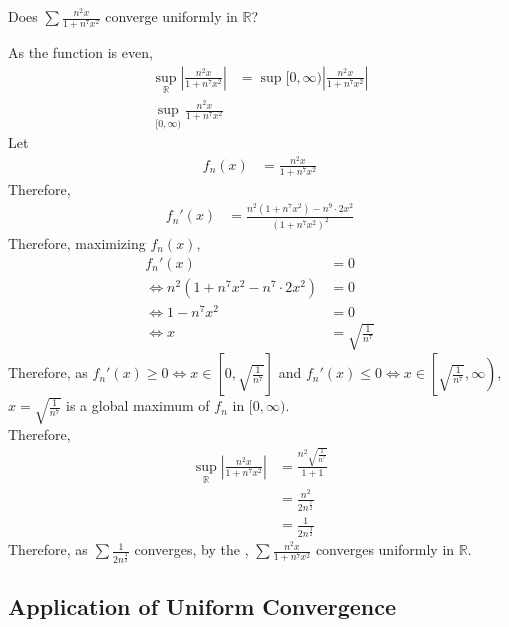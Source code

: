 \documentclass[fleqn, a4paper, 12pt, twoside]{article}
\theoremstyle{definition}
\theoremstyle{theorem}
\begin{document}
\begin{question}
	Does $\sum \frac{n^2 x}{1 + n^7 x^2}$ converge uniformly in $\mathbb{R}$?
\end{question}

\begin{solution}
	As the function is even,
	\begin{align*}
		\sup\limits_{\mathbb{R}} \left| \frac{n^2 x}{1 + n^7 x^2} \right| & = \sup\limits{[0,\infty)} \left| \frac{n^2 x}{1 + n^7 x^2} \right| \\
		\sup\limits_{[0,\infty)} \frac{n^2 x}{1 + n^7 x^2}
	\end{align*}
	Let
	\begin{align*}
		f_n(x) & = \frac{n^2 x}{1 + n^7 x^2}
	\end{align*}
	Therefore,
	\begin{align*}
		{f_n}'(x) & =\frac{n^2 (1 + n^7 x^2) - n^9 \cdot 2 x^2}{(1 + n^7 x^2)^2}
	\end{align*}
	Therefore, maximizing $f_n(x)$,
	\begin{align*}
		{f_n}'(x)                                & = 0 \\
		\iff n^2 (1 + n^7 x^2 - n^7 \cdot 2 x^2) & = 0 \\
		\iff 1 - n^7 x^2                         & = 0 \\
		\iff x                                   & = \sqrt{\frac{1}{n^7}}
	\end{align*}
	Therefore, as ${f_n}'(x) \ge 0 \iff x \in \left[ 0 , \sqrt{\frac{1}{n^7}} \right]$ and ${f_n}'(x) \le 0 \iff x \in \left[ \sqrt{\frac{1}{n^7}} , \infty \right)$, $x = \sqrt{\frac{1}{n^7}}$ is a global maximum of $f_n$ in $[0,\infty)$.\\
	Therefore,
	\begin{align*}
		\sup\limits_{\mathbb{R}} \left| \frac{n^2 x}{1 + n^7 x^2} \right| & = \frac{n^2 \sqrt{\frac{1}{n^7}}}{1 + 1} \\
                                                                                  & = \frac{n^2}{2 n^{\frac{7}{2}}}          \\
                                                                                  & = \frac{1}{2 n^{\frac{3}{2}}}
	\end{align*}
	Therefore, as $\sum \frac{1}{2 n^{\frac{3}{2}}}$ converges, by the , $\sum \frac{n^2 x}{1 + n^7 x^2}$ converges uniformly in $\mathbb{R}$.
\end{solution}

\subsection{Application of Uniform Convergence}
\end{document}
